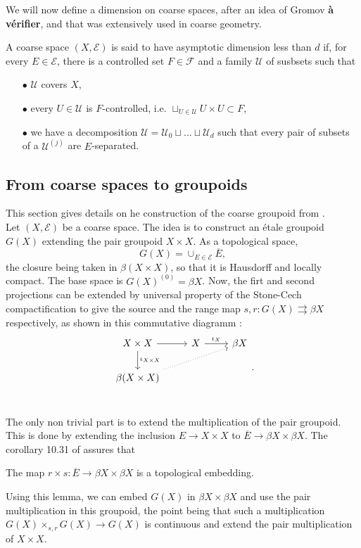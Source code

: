 We will now define a dimension on coarse spaces, after an idea of Gromov \textbf{à vérifier}, and that was extensively used in coarse geometry.\\

\begin{definition}
A coarse space $(X,\mathcal E)$ is said to have asymptotic dimension less than $d$ if, for every $E\in \mathcal E$, there is a controlled set $F\in\mathcal F$ and a family $\mathcal U$ of susbsets such that 
\begin{itemize}
\item[$\bullet$] $\mathcal U$ covers $X$,
\item[$\bullet$] every $U\in \mathcal U$ is $F$-controlled, i.e. $\sqcup_{U \in \mathcal U} U\times U \subset F$,
\item[$\bullet$] we have a decomposition $\mathcal U = \mathcal U_0 \sqcup ... \sqcup \mathcal U_d$ such that every pair of subsets of a $\mathcal U^{(j)}$ are $E$-separated.
\end{itemize}
\end{definition}

\subsection{From coarse spaces to groupoids}

This section gives details on he construction of the coarse groupoid from \cite{SkTuYu}.\\

Let $(X,\mathcal E)$ be a coarse space. The idea is to construct an étale groupoid $G(X)$ extending the pair groupoid $X\times X$. As a topological space, 
\[G(X)= \cup_{E\in \mathcal E} \overline{E},\]
the closure being taken in $\beta (X\times X)$, so that it is Hausdorff and locally compact. The base space is $G(X)^{(0)}=\beta X$. Now, the firt and second projections can be extended by universal property of the Stone-Cech compactification to give the source and the range map $s,r : G(X)\rightrightarrows \beta X$ respectively, as shown in this commutative diagramm :  
\[\begin{tikzcd}
X\times X \arrow{r}\arrow{d}{\iota_{X\times X}} &  X \arrow{r}{\iota_X} & \beta X \\
\beta (X\times X) \arrow[dotted]{urr} & & \\ 
\end{tikzcd}.\]

The only non trivial part is to extend the multiplication of the pair groupoid. This is done by extending the inclusion $E \rightarrow X\times X$ to $\overline{E} \rightarrow \beta X\times \beta X$. The corollary 10.31 of \cite{RoeCoarse} assures that 
\begin{lem}
The map $r\times s : \overline E \rightarrow \beta X\times \beta X$ is a topological embedding.
\end{lem}
Using this lemma, we can embed $G(X)$ in $\beta X\times \beta X$ and use the pair multiplication in this groupoid, the point being that such a multiplication $G(X)\times_{s,r} G(X) \rightarrow G(X)$ is continuous and extend the pair multiplication of $X\times X$.\\

